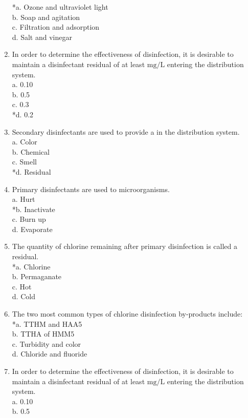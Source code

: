 \begin{enumerate}[1.]
*a. Ozone and ultraviolet light\\
b. Soap and agitation\\
c. Filtration and adsorption\\
d. Salt and vinegar\\
\item In order to determine the effectiveness of disinfection, it is desirable to maintain a disinfectant residual of at least $\mathrm{mg} / \mathrm{L}$ entering the distribution system.\\
a. 0.10\\
b. 0.5\\
c. 0.3\\
*d. 0.2\\
\item Secondary disinfectants are used to provide a in the distribution system.\\
a. Color\\
b. Chemical\\
c. Smell\\
*d. Residual\\
\item Primary disinfectants are used to microorganisms.\\
a. Hurt\\
*b. Inactivate\\
c. Burn up\\
d. Evaporate\\
\item The quantity of chlorine remaining after primary disinfection is called a residual.\\
*a. Chlorine\\
b. Permaganate\\
c. Hot\\
d. Cold\\
\item The two most common types of chlorine disinfection by-products include:\\
*a. TTHM and HAA5\\
b. TTHA of HMM5\\
c. Turbidity and color\\
d. Chloride and fluoride\\
\item In order to determine the effectiveness of disinfection, it is desirable to maintain a disinfectant residual of at least $\mathrm{mg} / \mathrm{L}$ entering the distribution system.\\
a. 0.10\\
b. 0.5\\

\end{enumerate}
